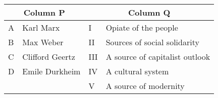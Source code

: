 \begin{tabular}{|ll|ll|}
        \hline
        \multicolumn{2}{|c|}{\textbf{Column P}} & \multicolumn{2}{c|}{\textbf{Column Q}} \\
        \hline
        A & Karl Marx & I & Opiate of the people \\
        B & Max Weber & II & Sources of social solidarity \\
        C & Clifford Geertz & III & A source of capitalist outlook \\
        D & Emile Durkheim & IV & A cultural system \\
          &               & V  & A source of modernity \\
        \hline
    \end{tabular}
